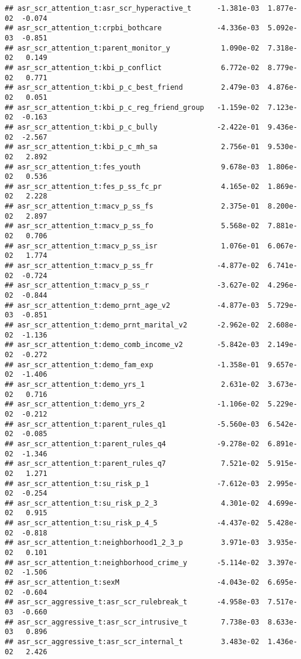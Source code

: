 \documentclass[
]{article}
\begin{document}
\begin{verbatim}
## asr_scr_attention_t:asr_scr_hyperactive_t      -1.381e-03  1.877e-02  -0.074
## asr_scr_attention_t:crpbi_bothcare             -4.336e-03  5.092e-03  -0.851
## asr_scr_attention_t:parent_monitor_y            1.090e-02  7.318e-02   0.149
## asr_scr_attention_t:kbi_p_conflict              6.772e-02  8.779e-02   0.771
## asr_scr_attention_t:kbi_p_c_best_friend         2.479e-03  4.876e-02   0.051
## asr_scr_attention_t:kbi_p_c_reg_friend_group   -1.159e-02  7.123e-02  -0.163
## asr_scr_attention_t:kbi_p_c_bully              -2.422e-01  9.436e-02  -2.567
## asr_scr_attention_t:kbi_p_c_mh_sa               2.756e-01  9.530e-02   2.892
## asr_scr_attention_t:fes_youth                   9.678e-03  1.806e-02   0.536
## asr_scr_attention_t:fes_p_ss_fc_pr              4.165e-02  1.869e-02   2.228
## asr_scr_attention_t:macv_p_ss_fs                2.375e-01  8.200e-02   2.897
## asr_scr_attention_t:macv_p_ss_fo                5.568e-02  7.881e-02   0.706
## asr_scr_attention_t:macv_p_ss_isr               1.076e-01  6.067e-02   1.774
## asr_scr_attention_t:macv_p_ss_fr               -4.877e-02  6.741e-02  -0.724
## asr_scr_attention_t:macv_p_ss_r                -3.627e-02  4.296e-02  -0.844
## asr_scr_attention_t:demo_prnt_age_v2           -4.877e-03  5.729e-03  -0.851
## asr_scr_attention_t:demo_prnt_marital_v2       -2.962e-02  2.608e-02  -1.136
## asr_scr_attention_t:demo_comb_income_v2        -5.842e-03  2.149e-02  -0.272
## asr_scr_attention_t:demo_fam_exp               -1.358e-01  9.657e-02  -1.406
## asr_scr_attention_t:demo_yrs_1                  2.631e-02  3.673e-02   0.716
## asr_scr_attention_t:demo_yrs_2                 -1.106e-02  5.229e-02  -0.212
## asr_scr_attention_t:parent_rules_q1            -5.560e-03  6.542e-02  -0.085
## asr_scr_attention_t:parent_rules_q4            -9.278e-02  6.891e-02  -1.346
## asr_scr_attention_t:parent_rules_q7             7.521e-02  5.915e-02   1.271
## asr_scr_attention_t:su_risk_p_1                -7.612e-03  2.995e-02  -0.254
## asr_scr_attention_t:su_risk_p_2_3               4.301e-02  4.699e-02   0.915
## asr_scr_attention_t:su_risk_p_4_5              -4.437e-02  5.428e-02  -0.818
## asr_scr_attention_t:neighborhood1_2_3_p         3.971e-03  3.935e-02   0.101
## asr_scr_attention_t:neighborhood_crime_y       -5.114e-02  3.397e-02  -1.506
## asr_scr_attention_t:sexM                       -4.043e-02  6.695e-02  -0.604
## asr_scr_aggressive_t:asr_scr_rulebreak_t       -4.958e-03  7.517e-03  -0.660
## asr_scr_aggressive_t:asr_scr_intrusive_t        7.738e-03  8.633e-03   0.896
## asr_scr_aggressive_t:asr_scr_internal_t         3.483e-02  1.436e-02   2.426

\end{verbatim}
\end{document}
